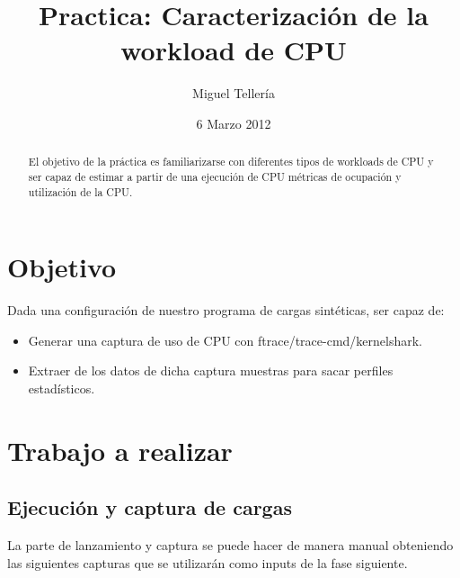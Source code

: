 \documentclass[a4paper,11pt,spanish,twoside]{article}
\begin{document}
\title{Practica:  Caracterización de la workload de CPU}

\author{Miguel Tellería }

\date{6 Marzo 2012}

\maketitle
\thispagestyle{empty} %

\begin{abstract}

El objetivo de la práctica es familiarizarse con diferentes tipos de
workloads de CPU y ser capaz de estimar a partir de una ejecución de
CPU métricas de ocupación y utilización de la CPU.

\end{abstract}

\section{Objetivo}
\label{sec:objetivo}

Dada una configuración de nuestro programa de cargas sintéticas, ser
capaz de:

\begin{itemize}
\item Generar una captura de uso de CPU con ftrace/trace-cmd/kernelshark.

\item Extraer de los datos de dicha captura muestras para sacar
  perfiles estadísticos.

\end{itemize}

\section{Trabajo a realizar}
\label{sec:trabajo}

\subsection{Ejecución y captura de cargas}
\label{sec:ejecucionycaptura}

La parte de lanzamiento y captura se puede hacer de manera manual
obteniendo las siguientes capturas que se utilizarán como inputs de la
fase siguiente.
\end{document}
